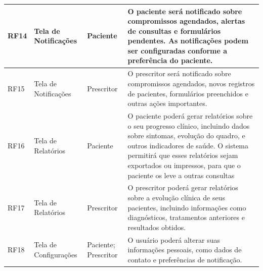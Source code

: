 \href{}{}\documentclass[12pt,portuguese,oneside]{article}
\begin{document}
\begin{table}[H]
\begin{tabularx}{\textwidth}{|>{\raggedright\arraybackslash}p{1cm}|>{\raggedright\arraybackslash}p{3cm}|>{\raggedright\arraybackslash}p{2cm}|>{\raggedright\arraybackslash}X|}
\hline
RF14 & Tela de Notificações & Paciente & O paciente será notificado sobre compromissos agendados, alertas de consultas e formulários pendentes. As notificações podem ser configuradas conforme a preferência do paciente.\\
\hline
RF15 & Tela de Notificações & Prescritor & O prescritor será notificado sobre compromissos agendados, novos registros de pacientes, formulários preenchidos e outras ações importantes.\\
\hline
RF16 & Tela de Relatórios & Paciente & O paciente poderá gerar relatórios sobre o seu progresso clínico, incluindo dados sobre sintomas, evolução do quadro, e outros indicadores de saúde. O sistema permitirá que esses relatórios sejam exportados ou impressos, para que o paciente os leve a outras consultas\\
\hline
RF17 & Tela de Relatórios & Prescritor & O prescritor poderá gerar relatórios sobre a evolução clínica de seus pacientes, incluindo informações como diagnósticos, tratamentos anteriores e resultados obtidos.\\
\hline
RF18 & Tela de Configurações & Paciente; Prescritor & O usuário poderá alterar suas informações pessoais, como dados de contato e preferências de notificação.\\
\hline
\end{tabularx}
\end{table}
\end{document}
